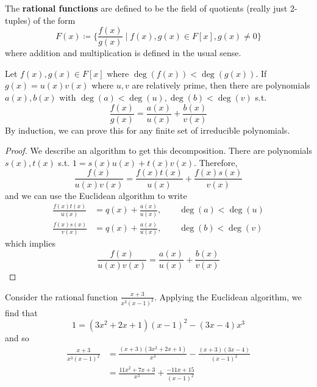   \begin{definition}
    The \textbf{rational functions} are defined to be the field of quotients (really just 2-tuples) of the form 
    \begin{equation}
      F(x) \coloneqq \bigg\{ \frac{f(x)}{g(x)} \; \bigg| \; f(x), g(x) \in F[x], g(x) \neq 0 \bigg\}
    \end{equation}
    where addition and multiplication is defined in the usual sense.
  \end{definition}

  \begin{theorem}
    Let $f(x), g(x) \in F[x]$ where $\deg(f(x)) < \deg(g(x))$. If $g(x) = u(x) v(x)$ where $u, v$ are relatively prime, then there are polynomials $a(x), b(x)$ with $\deg(a) < \deg(u), \deg(b) < \deg(v)$ s.t. 
    \begin{equation}
      \frac{f(x)}{g(x)} = \frac{a(x)}{u(x)} + \frac{b(x)}{v(x)}
    \end{equation}
    By induction, we can prove this for any finite set of irreducible polynomials. 
  \end{theorem}
  \begin{proof}
    We describe an algorithm to get this decomposition. There are polynomials $s(x), t(x)$ s.t. $1 = s(x) u(x) + t(x) v(x)$. Therefore, 
    \begin{equation}
      \frac{f(x)}{ u(x) v(x)} = \frac{f(x) t(x)}{u(x)} + \frac{f(x) s(x)}{v(x)}
    \end{equation}
    and we can use the Euclidean algorithm to write 
    \begin{align}
      \frac{f(x) t(x)}{u(x)} & = q(x) + \frac{a(x)}{u(x)}, \qquad \deg(a) < \deg(u) \\
      \frac{f(x) s(x)}{v(x)} & = q(x) + \frac{a(x)}{u(x)}, \qquad \deg(b) < \deg(v)
    \end{align}
    which implies 
    \begin{equation}
      \frac{f(x)}{u(x) v(x)} = \frac{a(x)}{u(x)} + \frac{b(x)}{v(x)}
    \end{equation}
  \end{proof}

  \begin{example}
    Consider the rational function $\frac{x + 3}{x^3 (x - 1)^2}$. Applying the Euclidean algorithm, we find that 
    \begin{equation}
      1 = (3x^2 + 2x + 1) (x - 1)^2 - (3x - 4) x^3
    \end{equation}
    and so 
    \begin{align}
      \frac{x + 3}{x^3 (x - 1)^2} & = \frac{(x + 3)(3x^2 + 2x + 1)}{x^3} - \frac{(x + 3)(3x - 4)}{(x - 1)^2} \\
                                  & = \frac{11x^2 + 7x + 3}{x^3} + \frac{-11x + 15}{(x - 1)^2}
    \end{align}
  \end{example}



